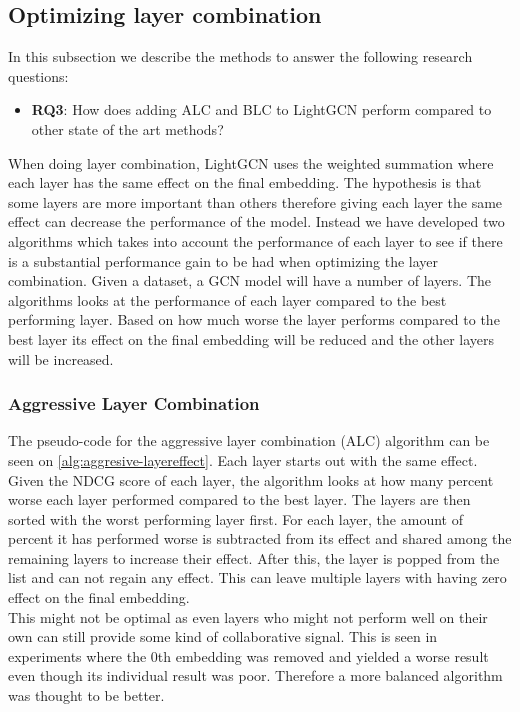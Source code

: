 \subsection{Optimizing layer combination}

In this subsection we describe the methods to answer the following research questions:
\begin{itemize}
    \item \textbf{RQ3}: How does adding ALC and BLC to LightGCN perform compared to other state of the art methods?
\end{itemize}  

When doing layer combination, LightGCN uses the weighted summation where each layer has the same effect on the final embedding.
The hypothesis is that some layers are more important than others therefore giving each layer the same effect can decrease the performance of the model.
Instead we have developed two algorithms which takes into account the performance of each layer to see if there is a substantial performance gain to be had when optimizing the layer combination.
Given a dataset, a GCN model will have a number of layers.
The algorithms looks at the performance of each layer compared to the best performing layer.
Based on how much worse the layer performs compared to the best layer its effect on the final embedding will be reduced and the other layers will be increased.

\subsubsection{Aggressive Layer Combination}
The pseudo-code for the aggressive layer combination (ALC) algorithm can be seen on \autoref{alg:aggresive-layereffect}.
Each layer starts out with the same effect.
Given the NDCG score of each layer, the algorithm looks at how many percent worse each layer performed compared to the best layer.
The layers are then sorted with the worst performing layer first.
For each layer, the amount of percent it has performed worse is subtracted from its effect and shared among the remaining layers to increase their effect.
After this, the layer is popped from the list and can not regain any effect.
This can leave multiple layers with having zero effect on the final embedding.
\\
This might not be optimal as even layers who might not perform well on their own can still provide some kind of collaborative signal.
This is seen in experiments where the 0th embedding was removed and yielded a worse result even though its individual result was poor.
Therefore a more balanced algorithm was thought to be better.

